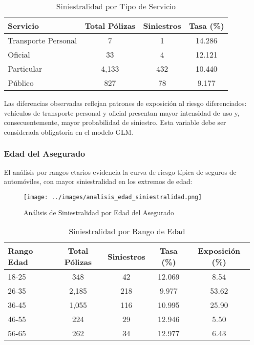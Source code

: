 \begin{table}[H]
\centering
\caption{Siniestralidad por Tipo de Servicio}
\begin{tabular}{|l|c|c|c|}
\hline
\textbf{Servicio} & \textbf{Total Pólizas} & \textbf{Siniestros} & \textbf{Tasa (\%)} \\
\hline
Transporte Personal & 7 & 1 & 14.286 \\
Oficial & 33 & 4 & 12.121 \\
Particular & 4,133 & 432 & 10.440 \\
Público & 827 & 78 & 9.177 \\
\hline
\end{tabular}
\end{table}

Las diferencias observadas reflejan patrones de exposición al riesgo diferenciados: vehículos de transporte personal y oficial presentan mayor intensidad de uso y, consecuentemente, mayor probabilidad de siniestro. Esta variable debe ser considerada obligatoria en el modelo GLM.

\subsubsection{Edad del Asegurado}

El análisis por rangos etarios evidencia la curva de riesgo típica de seguros de automóviles, con mayor siniestralidad en los extremos de edad:

\begin{figure}[H]
\centering
\texttt{[image: ../images/analisis\_edad\_siniestralidad.png]}
\caption{Análisis de Siniestralidad por Edad del Asegurado}
\end{figure}

\begin{table}[H]
\centering
\caption{Siniestralidad por Rango de Edad}
\begin{tabular}{|l|c|c|c|c|}
\hline
\textbf{Rango Edad} & \textbf{Total Pólizas} & \textbf{Siniestros} & \textbf{Tasa (\%)} & \textbf{Exposición (\%)} \\
\hline
18-25 & 348 & 42 & 12.069 & 8.54 \\
26-35 & 2,185 & 218 & 9.977 & 53.62 \\
36-45 & 1,055 & 116 & 10.995 & 25.90 \\
46-55 & 224 & 29 & 12.946 & 5.50 \\
56-65 & 262 & 34 & 12.977 & 6.43 \\
\hline
\end{tabular}
\end{table}

